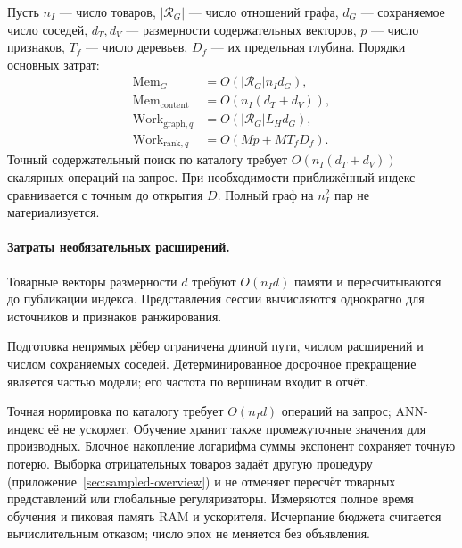 \documentclass[12pt,a4paper]{article}
\theoremstyle{plainru}
\begin{document}
Пусть \(n_I\) --- число товаров, \(|\mathcal R_G|\) --- число отношений графа,
\(d_G\) --- сохраняемое число соседей, \(d_T,d_V\) --- размерности
содержательных векторов, \(p\) --- число признаков, \(T_f\) --- число деревьев,
\(D_f\) --- их предельная глубина. Порядки основных затрат:
\begin{align}
\mathrm{Mem}_{G}&=O(|\mathcal R_G|n_Id_G),\label{eq:ops-graph-memory}\\
\mathrm{Mem}_{\mathrm{content}}&=O(n_I(d_T+d_V)),\label{eq:ops-content-memory}\\
\mathrm{Work}_{\mathrm{graph},q}&=O(|\mathcal R_G|L_Hd_G),\label{eq:ops-graph-work}\\
\mathrm{Work}_{\mathrm{rank},q}&=O(Mp+MT_fD_f).\label{eq:ops-rank-work}
\end{align}
Точный содержательный поиск по каталогу требует
\(O(n_I(d_T+d_V))\) скалярных операций на запрос.
При необходимости приближённый индекс сравнивается с точным
до открытия $D$. Полный граф на \(n_I^2\) пар не материализуется.

\paragraph{Затраты необязательных расширений.}
Товарные векторы размерности $d$ требуют $O(n_Id)$ памяти
и пересчитываются до публикации индекса. Представления сессии
вычисляются однократно для источников и признаков ранжирования.

Подготовка непрямых рёбер ограничена длиной пути, числом расширений
и числом сохраняемых соседей. Детерминированное досрочное прекращение
является частью модели; его частота по вершинам входит в отчёт.

Точная нормировка по каталогу требует $O(n_Id)$ операций на запрос;
ANN-индекс её не ускоряет. Обучение хранит также промежуточные значения
для производных. Блочное накопление логарифма суммы экспонент сохраняет
точную потерю. Выборка отрицательных товаров задаёт другую процедуру
(приложение~\ref{sec:sampled-overview}) и не отменяет пересчёт товарных
представлений или глобальные регуляризаторы.
Измеряются полное время обучения и пиковая память RAM и ускорителя.
Исчерпание бюджета считается вычислительным отказом;
число эпох не меняется без объявления.
\end{document}
